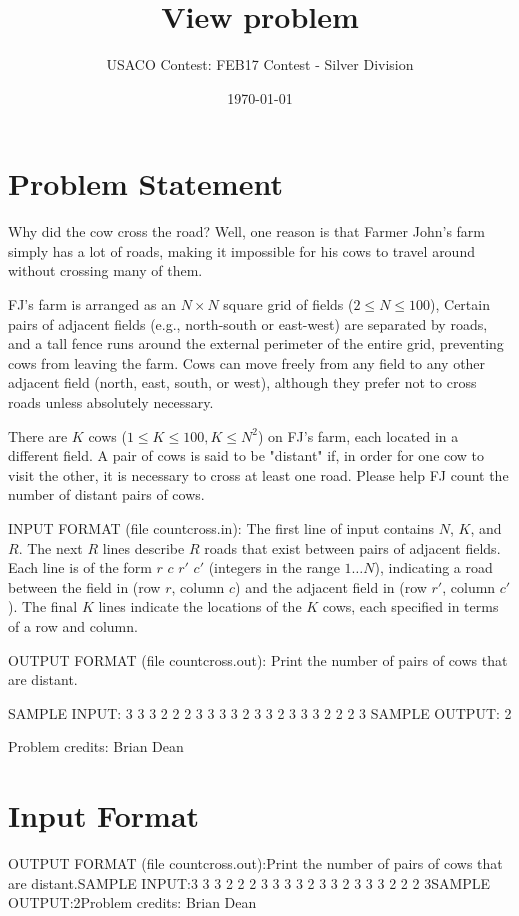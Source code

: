 \documentclass[12pt]{article}
\title{View problem}
\author{USACO Contest: FEB17 Contest - Silver Division}
\date{\today}
\begin{document}
\maketitle

\section*{Problem Statement}

Why did the cow cross the road?  Well, one reason is that Farmer John's farm
simply has a lot of roads, making it impossible for his cows to travel around
without crossing many of them.

FJ's farm is arranged as an $N \times N$ square grid of fields
($2 \leq N \leq 100$), Certain pairs of adjacent fields (e.g., north-south or
east-west) are separated by roads, and a tall fence runs around the external 
perimeter of the entire grid, preventing cows from leaving the farm.   Cows can
move freely from any field to any other adjacent field (north, east, south, or
west), although they prefer not to cross roads unless absolutely necessary.

There are $K$ cows ($1 \leq K \leq 100, K \leq N^2$) on FJ's farm, each located
in a  different field.  A pair of cows is said to be "distant" if, in order for
one cow to visit the other, it is necessary to cross at least one road. Please
help FJ count the number of distant pairs of cows.

INPUT FORMAT (file countcross.in):
The first line of input contains $N$, $K$, and $R$.  The next $R$ lines 
describe $R$ roads that exist between pairs of adjacent fields.  Each line is of
the form $r$ $c$ $r'$ $c'$ (integers in the range $1 \ldots N$), indicating a
road between the field in  (row $r$, column $c$) and the adjacent field in (row $r'$,
column $c'$).  The final $K$ lines indicate the locations of the $K$ cows, each
specified  in terms of a row and column.

OUTPUT FORMAT (file countcross.out):
Print the number of pairs of cows that are distant.

SAMPLE INPUT:
3 3 3
2 2 2 3
3 3 3 2
3 3 2 3
3 3
2 2
2 3
SAMPLE OUTPUT: 
2


Problem credits: Brian Dean



\section*{Input Format}
OUTPUT FORMAT (file countcross.out):Print the number of pairs of cows that are distant.SAMPLE INPUT:3 3 3
2 2 2 3
3 3 3 2
3 3 2 3
3 3
2 2
2 3SAMPLE OUTPUT:2Problem credits: Brian Dean
\end{document}
